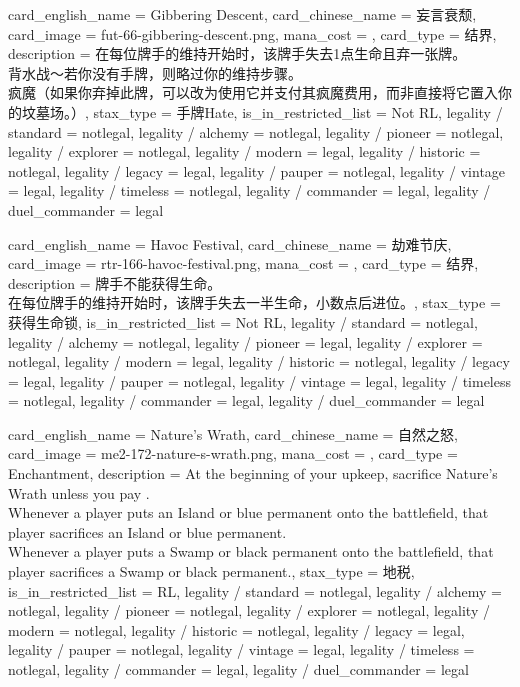 \documentclass[lang = cn, color = black, 10pt]{AllThatStax}
\begin{document}
\card
{
	card_english_name = {Gibbering Descent},
	card_chinese_name = {妄言衰颓},
	card_image = fut-66-gibbering-descent.png,
	mana_cost = ,
	card_type = 结界,
	description = {在每位牌手的维持开始时，该牌手失去1点生命且弃一张牌。\\
		背水战～若你没有手牌，则略过你的维持步骤。\\
		疯魔（如果你弃掉此牌，可以改为使用它并支付其疯魔费用，而非直接将它置入你的坟墓场。）},
	stax_type = 手牌Hate,
	is_in_restricted_list = Not RL,
	legality / standard = notlegal,
	legality / alchemy = notlegal,
	legality / pioneer = notlegal,
	legality / explorer = notlegal,
	legality / modern = legal,
	legality / historic = notlegal,
	legality / legacy = legal,
	legality / pauper = notlegal,
	legality / vintage = legal,
	legality / timeless = notlegal,
	legality / commander = legal,
	legality / duel_commander = legal
}

\card
{
	card_english_name = {Havoc Festival},
	card_chinese_name = {劫难节庆},
	card_image = rtr-166-havoc-festival.png,
	mana_cost = ,
	card_type = 结界,
	description = {牌手不能获得生命。\\
		在每位牌手的维持开始时，该牌手失去一半生命，小数点后进位。},
	stax_type = 获得生命锁,
	is_in_restricted_list = Not RL,
	legality / standard = notlegal,
	legality / alchemy = notlegal,
	legality / pioneer = legal,
	legality / explorer = notlegal,
	legality / modern = legal,
	legality / historic = notlegal,
	legality / legacy = legal,
	legality / pauper = notlegal,
	legality / vintage = legal,
	legality / timeless = notlegal,
	legality / commander = legal,
	legality / duel_commander = legal
}

\card
{
	card_english_name = {Nature's Wrath},
	card_chinese_name = {自然之怒},
	card_image = me2-172-nature-s-wrath.png,
	mana_cost = ,
	card_type = Enchantment,
	description = {At the beginning of your upkeep, sacrifice Nature's Wrath unless you pay .\\
		Whenever a player puts an Island or blue permanent onto the battlefield, that player sacrifices an Island or blue permanent.\\
		Whenever a player puts a Swamp or black permanent onto the battlefield, that player sacrifices a Swamp or black permanent.},
	stax_type = 地税,
	is_in_restricted_list = RL,
	legality / standard = notlegal,
	legality / alchemy = notlegal,
	legality / pioneer = notlegal,
	legality / explorer = notlegal,
	legality / modern = notlegal,
	legality / historic = notlegal,
	legality / legacy = legal,
	legality / pauper = notlegal,
	legality / vintage = legal,
	legality / timeless = notlegal,
	legality / commander = legal,
	legality / duel_commander = legal
}
\end{document}
